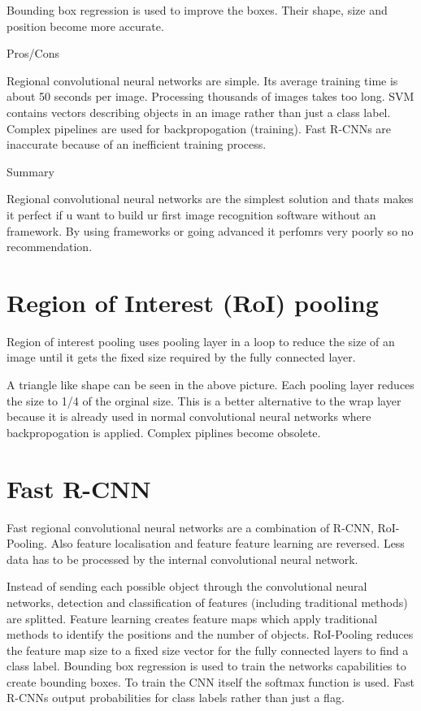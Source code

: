 \documentclass[a4paper,13pt,twoside]{book}
\begin{document}
Bounding box regression is used to improve the boxes. Their shape, size and position become more accurate.

Pros/Cons

Regional convolutional neural networks are simple. Its average training time is about 50 seconds per image. Processing thousands of images takes too long. SVM contains vectors describing objects in an image rather than just a class label. Complex pipelines are used for backpropogation (training).
Fast R-CNNs are inaccurate because of an inefficient training process.

Summary

Regional convolutional neural networks are the simplest solution and thats makes it perfect if u want to build ur first image recognition software without an framework. By using frameworks or going advanced it perfomrs very poorly so no recommendation.

\section{Region of Interest (RoI) pooling}

Region of interest pooling uses pooling layer in a loop to reduce the size of an image until it gets the fixed size required by the fully connected layer.

A triangle like shape can be seen in the above picture. Each pooling layer reduces the size to 1/4 of the orginal size.
This is a better alternative to the wrap layer because it is already used in normal convolutional neural networks where backpropogation is applied. Complex piplines become obsolete.

\section{Fast R-CNN}

Fast regional convolutional neural networks are a combination of R-CNN, RoI-Pooling. Also feature localisation and feature feature learning are reversed. Less data has to be processed by the internal convolutional neural network.

Instead of sending each possible object through the convolutional neural networks, detection and classification of features (including traditional methods) are splitted. Feature learning creates feature maps which apply traditional methods to identify the positions and the number of objects. RoI-Pooling reduces the feature map size to a fixed size vector for the fully connected layers to find a class label. Bounding box regression is used to train the networks capabilities to create bounding boxes. To train the CNN itself the softmax function is used. Fast R-CNNs output probabilities for class labels rather than just a flag.
\end{document}
